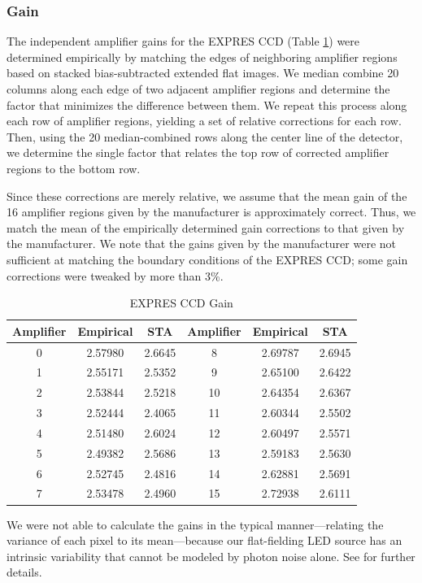 \subsubsection{Gain}\label{gain}

The independent amplifier gains for the EXPRES CCD (Table \ref{tab:gain}) were determined empirically by matching the edges of neighboring amplifier regions based on stacked bias-subtracted extended flat images. We median combine 20 columns along each edge of two adjacent amplifier regions and determine the factor that minimizes the difference between them. We repeat this process along each row of amplifier regions, yielding a set of relative corrections for each row. Then, using the 20 median-combined rows along the center line of the detector, we determine the single factor that relates the top row of corrected amplifier regions to the bottom row.

Since these corrections are merely relative, we assume that the mean gain of the 16 amplifier regions given by the manufacturer is approximately correct. Thus, we match the mean of the empirically determined gain corrections to that given by the manufacturer. We note that the gains given by the manufacturer were not sufficient at matching the boundary conditions of the EXPRES CCD; some gain corrections were tweaked by more than 3\%.

\begin{table}[ht!]
\centering
\caption{EXPRES CCD Gain\label{tab:gain}}
    \begin{tabular}{ccc|ccc}
        \hline
        \hline
        Amplifier & Empirical & STA & Amplifier & Empirical & STA \tabularnewline
        \hline
        0 & 2.57980 & 2.6645 & 8 & 2.69787 & 2.6945 \tabularnewline
        1 & 2.55171 & 2.5352 & 9 & 2.65100 & 2.6422 \tabularnewline
        2 & 2.53844 & 2.5218 & 10 & 2.64354 & 2.6367 \tabularnewline
        3 & 2.52444 & 2.4065 & 11 & 2.60344 & 2.5502 \tabularnewline
        4 & 2.51480 & 2.6024 & 12 & 2.60497 & 2.5571 \tabularnewline
        5 & 2.49382 & 2.5686 & 13 & 2.59183 & 2.5630 \tabularnewline
        6 & 2.52745 & 2.4816 & 14 & 2.62881 & 2.5691 \tabularnewline
        7 & 2.53478 & 2.4960 & 15 & 2.72938 & 2.6111 \tabularnewline
        \hline
    \end{tabular}
\end{table}

We were not able to calculate the gains in the typical manner---relating the variance of each pixel to its mean---because our flat-fielding LED source has an intrinsic variability that cannot be modeled by photon noise alone. See \citet{blackman_performance_2020} for further details.


